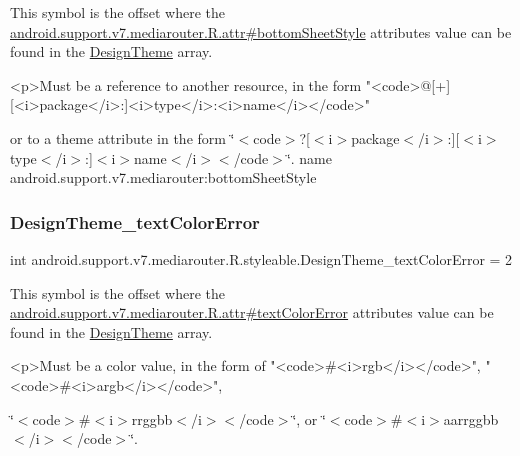 This symbol is the offset where the \hyperlink{classandroid_1_1support_1_1v7_1_1mediarouter_1_1R_1_1attr_ad8a192d0439755700da68cf9001f0ff7}{android.\+support.\+v7.\+mediarouter.\+R.\+attr\#bottom\+Sheet\+Style} attribute\textquotesingle{}s value can be found in the \hyperlink{classandroid_1_1support_1_1v7_1_1mediarouter_1_1R_1_1styleable_acb06effd66e79840e1295f063dfa8f82}{Design\+Theme} array.

\begin{DoxyVerb}      <p>Must be a reference to another resource, in the form "<code>@[+][<i>package</i>:]<i>type</i>:<i>name</i></code>"
\end{DoxyVerb}
 or to a theme attribute in the form \char`\"{}$<$code$>$?\mbox{[}$<$i$>$package$<$/i$>$\+:\mbox{]}\mbox{[}$<$i$>$type$<$/i$>$\+:\mbox{]}$<$i$>$name$<$/i$>$$<$/code$>$\char`\"{}.  name android.\+support.\+v7.\+mediarouter\+:bottom\+Sheet\+Style \mbox{\label{classandroid_1_1support_1_1v7_1_1mediarouter_1_1R_1_1styleable_a95d15a3901e4631d2c63fa74fc1884e5}} 
\subsubsection{\texorpdfstring{Design\+Theme\+\_\+text\+Color\+Error}{DesignTheme\_textColorError}}
{\footnotesize\ttfamily int android.\+support.\+v7.\+mediarouter.\+R.\+styleable.\+Design\+Theme\+\_\+text\+Color\+Error = 2\hspace{0.3cm}{\ttfamily [static]}}

This symbol is the offset where the \hyperlink{classandroid_1_1support_1_1v7_1_1mediarouter_1_1R_1_1attr_a4bc2751096afde8d80d665c65cd3fff0}{android.\+support.\+v7.\+mediarouter.\+R.\+attr\#text\+Color\+Error} attribute\textquotesingle{}s value can be found in the \hyperlink{classandroid_1_1support_1_1v7_1_1mediarouter_1_1R_1_1styleable_acb06effd66e79840e1295f063dfa8f82}{Design\+Theme} array.

\begin{DoxyVerb}      <p>Must be a color value, in the form of "<code>#<i>rgb</i></code>", "<code>#<i>argb</i></code>",
\end{DoxyVerb}
 \char`\"{}$<$code$>$\#$<$i$>$rrggbb$<$/i$>$$<$/code$>$\char`\"{}, or \char`\"{}$<$code$>$\#$<$i$>$aarrggbb$<$/i$>$$<$/code$>$\char`\"{}. 

